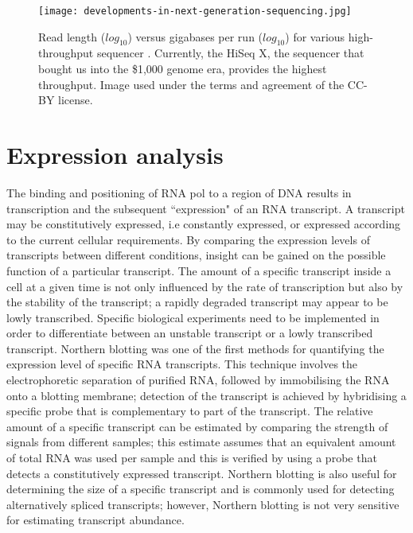 \begin{figure}[!ht]
   \centering
   \texttt{[image: developments-in-next-generation-sequencing.jpg]}
   \caption[Developments in next generation sequencing]{Read length ($ log_{10} $) versus gigabases per run ($ log_{10} $) for various high-throughput sequencer \citep{Nederbragt2012}. Currently, the HiSeq X, the sequencer that bought us into the \$1,000 genome era, provides the highest throughput. Image used under the terms and agreement of the CC-BY license.}
   \label{fig:dev_next_gen}
\end{figure}

\section{Expression analysis}

The binding and positioning of RNA pol to a region of DNA results in transcription and the subsequent ``expression" of an RNA transcript. A transcript may be constitutively expressed, i.e constantly expressed, or expressed according to the current cellular requirements. By comparing the expression levels of transcripts between different conditions, insight can be gained on the possible function of a particular transcript. The amount of a specific transcript inside a cell at a given time is not only influenced by the rate of transcription but also by the stability of the transcript; a rapidly degraded transcript may appear to be lowly transcribed. Specific biological experiments need to be implemented in order to differentiate between an unstable transcript or a lowly transcribed transcript. Northern blotting \citep{pmid414220} was one of the first methods for quantifying the expression level of specific RNA transcripts. This technique involves the electrophoretic separation of purified RNA, followed by immobilising the RNA onto a blotting membrane; detection of the transcript is achieved by hybridising a specific probe that is complementary to part of the transcript. The relative amount of a specific transcript can be estimated by comparing the strength of signals from different samples; this estimate assumes that an equivalent amount of total RNA was used per sample and this is verified by using a probe that detects a constitutively expressed transcript. Northern blotting is also useful for determining the size of a specific transcript and is commonly used for detecting alternatively spliced transcripts; however, Northern blotting is not very sensitive for estimating transcript abundance.

